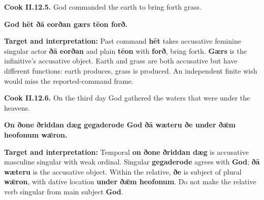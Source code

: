 \par\begin{minipage}{\linewidth}\raggedright
\textbf{Cook II.12.5.} God commanded the earth to bring forth grass.

\textbf{God hēt ðā eorðan gærs tēon forð.}

\textbf{Target and interpretation:} Past command \textbf{hēt} takes accusative feminine singular actor \textbf{ðā eorðan} and plain \textbf{tēon} with \textbf{forð}, bring forth. \textbf{Gærs} is the infinitive's accusative object. Earth and grass are both accusative but have different functions: earth produces, grass is produced. An independent finite wish would miss the reported-command frame.

\end{minipage}\par\addvspace{4pt}

\par\begin{minipage}{\linewidth}\raggedright
\textbf{Cook II.12.6.} On the third day God gathered the waters that were under the heavens.

\textbf{On ðone ðriddan dæg gegaderode God ðā wæteru ðe under ðǣm heofonum wǣron.}

\textbf{Target and interpretation:} Temporal \textbf{on ðone ðriddan dæg} is accusative masculine singular with weak ordinal. Singular \textbf{gegaderode} agrees with \textbf{God}; \textbf{ðā wæteru} is the accusative object. Within the relative, \textbf{ðe} is subject of plural \textbf{wǣron}, with dative location \textbf{under ðǣm heofonum}. Do not make the relative verb singular from main subject \textbf{God}.

\end{minipage}\par\addvspace{4pt}

